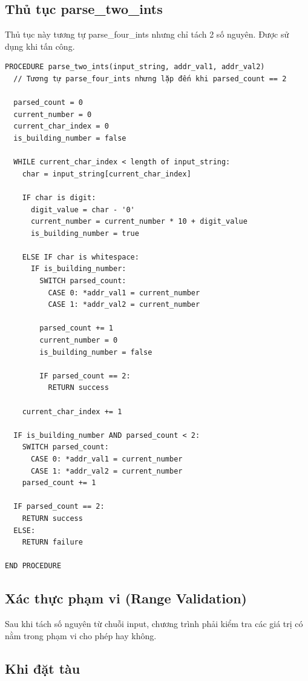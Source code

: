 \subsection{Thủ tục parse\_two\_ints}

Thủ tục này tương tự parse\_four\_ints nhưng chỉ tách 2 số nguyên. Được sử dụng khi tấn công.

\begin{verbatim}
PROCEDURE parse_two_ints(input_string, addr_val1, addr_val2)
  // Tương tự parse_four_ints nhưng lặp đến khi parsed_count == 2
  
  parsed_count = 0
  current_number = 0
  current_char_index = 0
  is_building_number = false
  
  WHILE current_char_index < length of input_string:
    char = input_string[current_char_index]
    
    IF char is digit:
      digit_value = char - '0'
      current_number = current_number * 10 + digit_value
      is_building_number = true
    
    ELSE IF char is whitespace:
      IF is_building_number:
        SWITCH parsed_count:
          CASE 0: *addr_val1 = current_number
          CASE 1: *addr_val2 = current_number
        
        parsed_count += 1
        current_number = 0
        is_building_number = false
        
        IF parsed_count == 2:
          RETURN success
    
    current_char_index += 1
  
  IF is_building_number AND parsed_count < 2:
    SWITCH parsed_count:
      CASE 0: *addr_val1 = current_number
      CASE 1: *addr_val2 = current_number
    parsed_count += 1
  
  IF parsed_count == 2:
    RETURN success
  ELSE:
    RETURN failure

END PROCEDURE
\end{verbatim}

\subsection{Xác thực phạm vi (Range Validation)}

Sau khi tách số nguyên từ chuỗi input, chương trình phải kiểm tra các giá trị có nằm trong phạm vi cho phép hay không.

\subsection{Khi đặt tàu}


